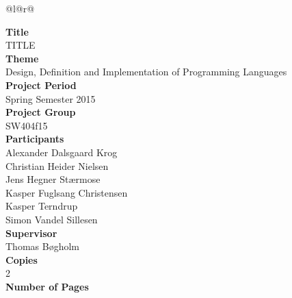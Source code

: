 
\begin{nopagebreak}
{\begin{center}
    \begin{tabular*}{\textwidth}{@{}l@{\extracolsep{\fill}}r@{}}
        \\
        \begin{minipage}[t]{0.49\textwidth}
            \textbf{Title}\\
            TITLE\\

            \textbf{Theme}\\
            Design, Definition and Implementation of Programming Languages\\

            \textbf{Project Period}\\
            Spring Semester 2015\\

            \textbf{Project Group}\\
            SW404f15\\

            \textbf{Participants}\\
            Alexander Dalsgaard Krog\\
            Christian Heider Nielsen\\
            Jens Hegner Stærmose\\
            Kasper Fuglsang Christensen\\
            Kasper Terndrup\\
            Simon Vandel Sillesen\\

            \textbf{Supervisor}\\
            Thomas Bøgholm\\

            \textbf{Copies}\\
            2\\ %

            \textbf{Number of Pages}\\
            \pageref{LastPage}\\


\end{minipage}
\end{tabular*}
\end{center}}
\end{nopagebreak}
